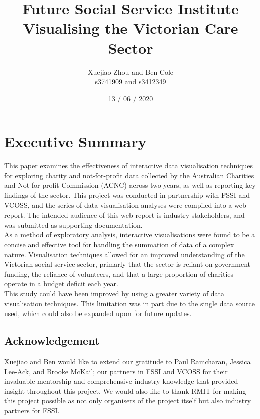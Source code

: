 \documentclass[
  11pt,
]{article}
\title{Future Social Service Institute\\
Visualising the Victorian Care Sector}
\author{Xuejiao Zhou and Ben Cole\\
s3741909 and s3412349}
\date{13 / 06 / 2020}
\begin{document}
\maketitle

{
\setcounter{tocdepth}{2}
\tableofcontents
}
\newpage
{}

\hypertarget{executive-summary}{%
\section*{Executive Summary}\label{executive-summary}}

This paper examines the effectiveness of interactive data visualisation techniques for exploring charity and not-for-profit data collected by the Australian Charities and Not-for-profit Commission (ACNC) across two years, as well as reporting key findings of the sector.
This project was conducted in partnership with FSSI and VCOSS, and the series of data visualisation analyses were compiled into a web report. The intended audience of this web report is industry stakeholders, and was submitted as supporting documentation.\\
As a method of exploratory analysis, interactive visualisations were found to be a concise and effective tool for handling the summation of data of a complex nature. Visualisation techniques allowed for an improved understanding of the Victorian social service sector, primarly that the sector is reliant on government funding, the reliance of volunteers, and that a large proportion of charities operate in a budget deficit each year.\\
This study could have been improved by using a greater variety of data visualisation techniques. This limitation was in part due to the single data source used, which could also be expanded upon for future updates.

\hypertarget{acknowledgement}{%
\subsection*{Acknowledgement}\label{acknowledgement}}

Xuejiao and Ben would like to extend our gratitude to Paul Ramcharan, Jessica Lee-Ack, and Brooke McKail; our partners in FSSI and VCOSS for their invaluable mentorship and comprehensive industry knowledge that provided insight throughout this project. We would also like to thank RMIT for making this project possible as not only organisers of the project itself but also industry partners for FSSI.
\end{document}
